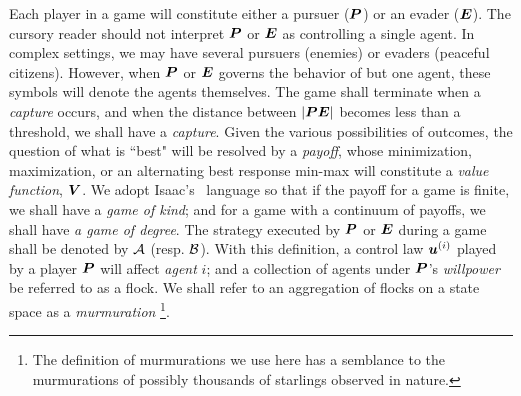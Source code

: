 Each player in a game will constitute either a pursuer ($\bm{P}$) or an evader ($\bm{E}$). The cursory reader should not interpret $\bm{P}$ or $\bm{E}$ as controlling a single agent. In complex settings, we may have several pursuers (enemies) or evaders (peaceful citizens). However, when $\bm{P}$ or $\bm{E}$ governs the behavior of but one agent, these symbols will denote the agents themselves. The game shall terminate when a \textit{capture} occurs, and when the distance between $|\bm{P} \bm{E}|$ becomes less than a threshold, we shall have a \textit{capture}. Given the various possibilities of outcomes, the question of what is ``best" will be resolved by a \textit{payoff}, whose minimization, maximization, or an alternating best response min-max will constitute a \textit{value function}, $\bm{V}$. We adopt Isaac's~\cite{Isaacs1965} language so that if the payoff for a game is finite, we shall have a \textit{game of kind}; and for a game with a continuum of payoffs, we shall have \textit{a game of degree}. The strategy executed by $\bm{P}$ or $\bm{E}$ during a game shall be denoted by $\mathcal{A}$ (resp. $\mathcal{B}$). With this definition, a control law \eg $\bm{u}^{(i)}$ played by a player \eg $\bm{P}$ will affect \textit{agent} $i$; and a collection of agents under $\bm{P}$'s \textit{willpower} be referred to as a flock. We shall refer to an aggregation of flocks on a state space as a \textit{murmuration} \footnote{The definition of murmurations we use here has a semblance to the murmurations of possibly thousands of starlings observed in nature.}.
%